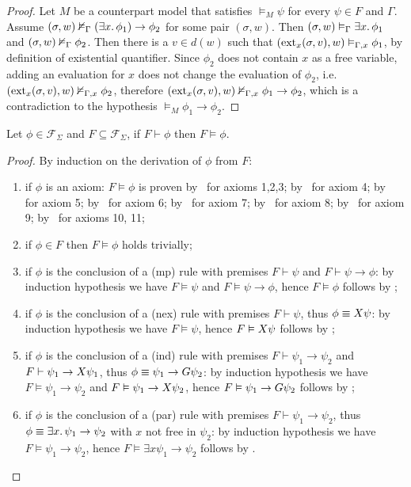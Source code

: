 \begin{proof}
  Let $M$ be a counterpart model that satisfies $\vDash_M \psi$ for every $\psi \in F$ and $\Gamma$.
  Assume $({\sigma}, {w}) \nvDash_{\Gamma} {(\exists {x} \ldotp {\phi_1}) \to \phi_2}$ for some pair $(\sigma, w)$. Then
  $({\sigma}, {w}) \vDash_{\Gamma} {\exists {x} \ldotp {\phi_1}}$ and $({\sigma}, {w}) \nvDash_{\Gamma} {\phi_2}$.
  Then there is a $v \in d(w)$ such that $({\text{ext}_{x}({\sigma},{v})}, {w}) \vDash_{\Gamma, x} {\phi_1}$, by definition of existential
  quantifier. Since $\phi_2$ does not contain $x$ as a free variable, adding an evaluation for $x$ does not change the
  evaluation of $\phi_2$, i.e. $({\text{ext}_{x}({\sigma},{v})}, {w}) \nvDash_{\Gamma, x} {\phi_2}$, therefore
  $({\text{ext}_{x}({\sigma},{v})}, {w}) \nvDash_{\Gamma, x} {\phi_1 \to \phi_2}$, which is a contradiction to the hypothesis $\vDash_M
  \phi_1 \to \phi_2$.
\end{proof}

\begin{theorem}[Soundness]
  Let $\phi \in \mathcal{F}_\Sigma$ and $F \subseteq \mathcal{F}_\Sigma$, if $F \vdash \phi$ then $F \vDash \phi$.
\end{theorem}
\begin{proof}
  By induction on the derivation of $\phi$ from $F$:
  \begin{enumerate}
    \item if $\phi$ is an axiom: $F \vDash \phi$ is proven by~ for axioms 1,2,3;
      by~ for axiom 4; by~ for axiom 5; by~ for axiom 6;
      by~ for axiom 7; by~ for axiom 8; by~ for axiom 9;
      by~ for axioms 10, 11;
    \item if $\phi \in F$ then $F \vDash \phi$ holds trivially;
    \item if $\phi$ is the conclusion of a (mp) rule with premises $F \vdash \psi$ and $F \vdash \psi \to \phi$: by
      induction hypothesis we have $F \vDash \psi$ and $F \vDash \psi \to \phi$, hence $F \vDash \phi$ follows by
      ;
    \item if $\phi$ is the conclusion of a (nex) rule with premises $F \vdash \psi$, thus $\phi \equiv X{\psi}$: by
      induction hypothesis we have $F \vDash \psi$, hence $F \vDash X{\psi}$ follows by ;
    \item if $\phi$ is the conclusion of a (ind) rule with premises $F \vdash \psi_1 \to \psi_2$ and $F \vdash \psi_1
      \to X{\psi_1}$, thus $\phi \equiv \psi_1 \to G{\psi_2}$: by induction hypothesis we have $F \vDash
      \psi_1 \to \psi_2$ and $F \vDash \psi_1 \to X{\psi_2}$, hence $F \vDash \psi_1 \to G{\psi_2}$ follows
      by ;
    \item if $\phi$ is the conclusion of a (par) rule with premises $F \vdash \psi_1 \to \psi_2$, thus $\phi \equiv
      \exists {x} \ldotp {\psi_1} \to \psi_2$ with $x$ not free in $\psi_2$: by induction hypothesis we have $F \vDash \psi_1
      \to \psi_2$, hence $F \vDash \exists{x}{\psi_1} \to \psi_2$ follows by .
  \end{enumerate}
\end{proof}


